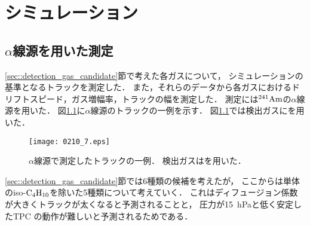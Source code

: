 \documentclass[../master]{subfiles}
\begin{document}
\chapter{シミュレーション}
\label{chap::simulation}
\section{$\alpha$線源を用いた測定}
\ref{sec::detection_gas_candidate}節で考えた各ガスについて，
シミュレーションの基準となるトラックを測定した．
また，それらのデータから各ガスにおけるドリフトスピード，ガス増幅率，トラックの幅を測定した．
測定には${}^{241}{\rm Am}$の$\alpha$線源を用いた．
図\ref{fig::a_source_track}に$\alpha$線源のトラックの一例を示す．
図\ref{fig::a_source_track}では検出ガスに\isoButaneHydro を用いた．
\begin{figure}
  \centering
  \texttt{[image: 0210\_7.eps]}
  \caption[$\alpha$線源で測定したトラックの一例．]
          {$\alpha$線源で測定したトラックの一例．
          検出ガスは\isoButaneHydro を用いた．}
  \label{fig::a_source_track}
\end{figure}
\ref{sec::detection_gas_candidate}節では6種類の候補を考えたが，
ここからは単体のiso-$\rm C_{4}H_{10}$を除いた5種類について考えていく．
これはディフュージョン係数が大きくトラックが太くなると予測されることと，
圧力が\SI{15}{\hecto\pascal}と低く安定したTPC の動作が難しいと予測されるためである．
\end{document}
